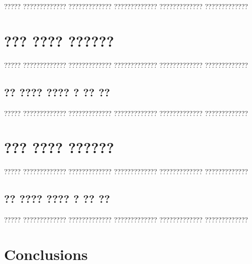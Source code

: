 \documentclass[11pt,catalan,listoffigures,listoftables]{tfgetsinf}
\begin{document}
????? ????????????? ????????????? ????????????? ????????????? ????????????? 




\chapter{??? ???? ??????}

????? ????????????? ????????????? ????????????? ????????????? ?????????????

\section{?? ???? ???? ? ?? ??}

????? ????????????? ????????????? ????????????? ????????????? ?????????????

\chapter{??? ???? ??????}

????? ????????????? ????????????? ????????????? ????????????? ????????????? 

\section{?? ???? ???? ? ?? ??}

????? ????????????? ????????????? ????????????? ????????????? ?????????????


\chapter{Conclusions}
\end{document}
